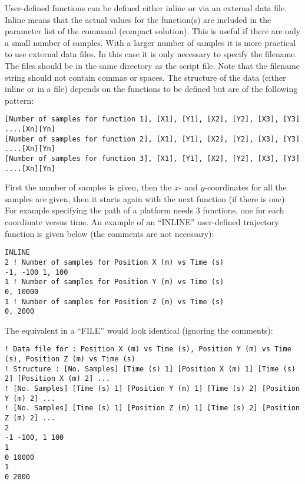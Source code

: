 User-defined functions can be defined either inline or via an external data
file. Inline means that the actual values for the function(s) are included
in the parameter list of the command (compact solution). This is useful if
there are only a small number of samples. With a larger number of samples it
is more practical to use external data files. In this case it is only
necessary to specify the filename. The files should be in the same directory
as the script file. Note that the filename string should not contain commas
or spaces. The structure of the data (either inline or in a file) depends on
the functions to be defined but are of the following pattern:

\tiny
%
\begin{verbatim}
[Number of samples for function 1], [X1], [Y1], [X2], [Y2], [X3], [Y3] ....[Xn][Yn]
[Number of samples for function 2], [X1], [Y1], [X2], [Y2], [X3], [Y3] ....[Xn][Yn]
[Number of samples for function 3], [X1], [Y1], [X2], [Y2], [X3], [Y3] ....[Xn][Yn]
\end{verbatim}

\normalsize%

First the number of samples is given, then the $x$- and $y$-coordinates for
all the samples are given, then it starts again with the next function (if
there is one). For example specifying the path of a platform needs $3$
functions, one for each coordinate versus time. An example of an ``INLINE''
user-defined trajectory function is given below (the comments are not
necessary):

\tiny
%
\begin{verbatim}
INLINE
2 ! Number of samples for Position X (m) vs Time (s)
-1, -100 1, 100
1 ! Number of samples for Position Y (m) vs Time (s)
0, 10000
1 ! Number of samples for Position Z (m) vs Time (s)
0, 2000
\end{verbatim}

\normalsize%

The equivalent in a ``FILE'' would look identical (ignoring the comments):

\tiny
%
\begin{verbatim}
! Data file for : Position X (m) vs Time (s), Position Y (m) vs Time (s), Position Z (m) vs Time (s)
! Structure : [No. Samples] [Time (s) 1] [Position X (m) 1] [Time (s) 2] [Position X (m) 2] ...
! [No. Samples] [Time (s) 1] [Position Y (m) 1] [Time (s) 2] [Position Y (m) 2] ...
! [No. Samples] [Time (s) 1] [Position Z (m) 1] [Time (s) 2] [Position Z (m) 2] ...
2
-1 -100, 1 100
1
0 10000
1
0 2000
\end{verbatim}

